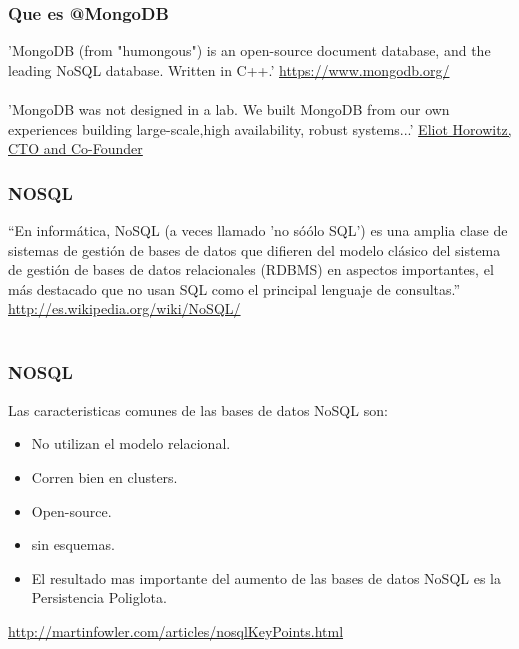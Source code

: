\documentclass{beamer}
\begin{document}
\begin{frame}
\frametitle{Que es @MongoDB}
'MongoDB (from "humongous") is an open-source document database, and the leading NoSQL database. Written in C++.'
{\color{blue}\url{https://www.mongodb.org/}}
\\~\\
'MongoDB was not designed in a lab. We built MongoDB from our own experiences building large-scale,high availability, robust systems...'
\underline{\color{green}Eliot Horowitz, CTO and Co-Founder}	
\end{frame}


\begin{frame}
\frametitle{NOSQL}
“En inform\'atica, NoSQL (a veces llamado 'no só\'olo SQL') es una amplia clase de sistemas de gesti\'on de bases de datos que difieren del modelo cl\'asico del sistema de gesti\'on de bases de datos relacionales (RDBMS) en aspectos importantes, el m\'as destacado que no usan SQL como el principal lenguaje de consultas.” {\color{blue}\url{http://es.wikipedia.org/wiki/NoSQL/}}
\\~\\

\end{frame}


\begin{frame}
\frametitle{NOSQL}
Las caracteristicas comunes de las bases de datos NoSQL son:
\begin{itemize}
\item No utilizan el modelo relacional.
\item Corren bien en clusters.
\item Open-source.
\item sin esquemas.
\item El resultado mas importante del aumento de las bases de datos NoSQL es la {\color{green}Persistencia Poliglota}.
\end{itemize}
{\color{blue}\url{http://martinfowler.com/articles/nosqlKeyPoints.html}}
\end{frame}

\end{document}
